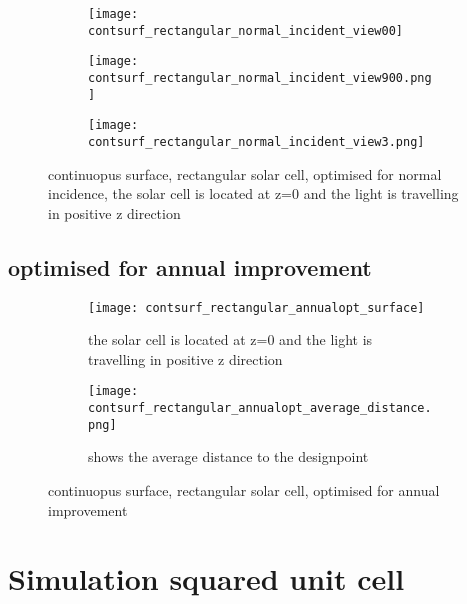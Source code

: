 \begin{figure}[h]
\centering
\begin{subfigure}{\textwidth}
\centering
\texttt{[image: contsurf\_rectangular\_normal\_incident\_view00]}
\caption{\label{contsurf_rectangular_normal_incident_view00}}
\end{subfigure}
\begin{subfigure}{\textwidth}
\centering
\texttt{[image: contsurf\_rectangular\_normal\_incident\_view900.png]}
\caption{ \label{contsurf_rectangular_normal_incident_view900}}
\end{subfigure}
\begin{subfigure}{\textwidth}
\centering
\texttt{[image: contsurf\_rectangular\_normal\_incident\_view3.png]}
\caption{ \label{contsurf_rectangular_normal_incident_view3}}
\end{subfigure}
\caption{continuopus surface, rectangular solar cell, optimised for normal incidence, the solar cell is located at z=0 and the light is travelling in positive z direction}
\end{figure}


\subsection{optimised for annual improvement}

\begin{figure}[h]
\centering
\begin{subfigure}{0.45\textwidth}
\centering
\texttt{[image: contsurf\_rectangular\_annualopt\_surface]}
\caption{the solar cell is located at z=0 and the light is travelling in positive z direction\label{contsurf_rectangular_annualopt_surface}}
\end{subfigure}
\begin{subfigure}{0.45\textwidth}
\centering
\texttt{[image: contsurf\_rectangular\_annualopt\_average\_distance.png]}
\caption{shows the average distance to the designpoint \label{contsurf_rectangular_annualopt_average_distance}}
\end{subfigure}
\caption{continuopus surface, rectangular solar cell, optimised for annual improvement}
\end{figure}

\section{Simulation squared unit cell}
